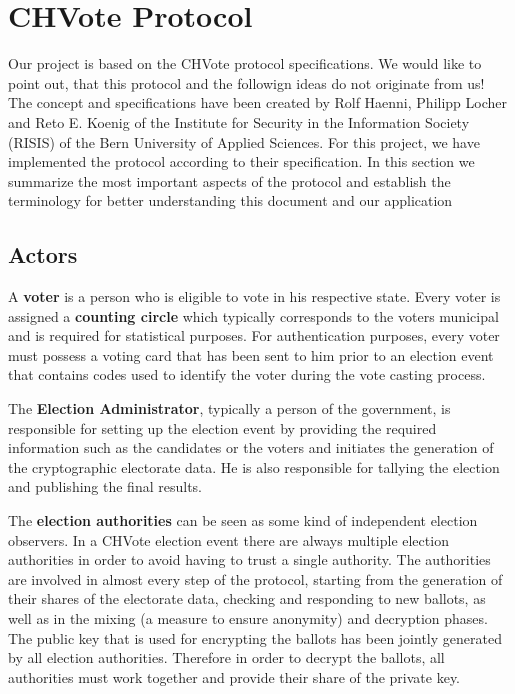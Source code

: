\chapter{CHVote Protocol}
Our project is based on the CHVote protocol specifications. We would like to point out, that this protocol and the followign ideas do not originate from us! The concept and specifications have been created by Rolf Haenni, Philipp Locher and Reto E. Koenig of the Institute for Security in the Information Society (RISIS) of the Bern University of Applied Sciences. For this project, we have implemented the protocol according to their specification. In this section we summarize the most important aspects of the protocol and establish the terminology for better understanding this document and our application

\section{Actors}
A \textbf{voter} is a person who is eligible to vote in his respective state. Every voter is assigned a \textbf{counting circle} which typically corresponds to the voters municipal and is required for statistical purposes. For authentication purposes, every voter must possess a voting card that has been sent to him prior to an election event that contains codes used to identify the voter during the vote casting process.

The \textbf{Election Administrator}, typically a person of the government, is responsible for setting up the election event by providing the required information such as the candidates or the voters and initiates the generation of the cryptographic electorate data. He is also responsible for tallying the election and publishing the final results.

The \textbf{election authorities} can be seen as some kind of independent election observers. In a CHVote election event there are always multiple election authorities in order to avoid having to trust a single authority. The authorities are involved in almost every step of the protocol, starting from the generation of their shares of the electorate data, checking and responding to new ballots, as well as in the mixing (a measure to ensure anonymity) and decryption phases. The public key that is used for encrypting the ballots has been jointly generated by all election authorities. Therefore in order to decrypt the ballots, all authorities must work together and provide their share of the private key. 

